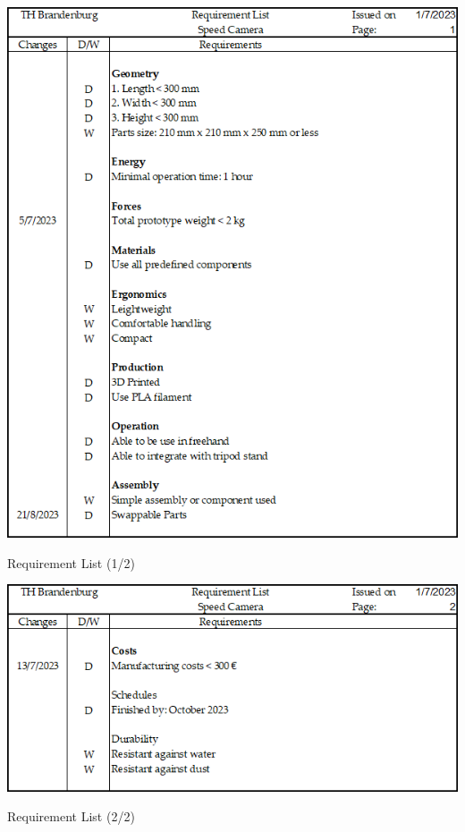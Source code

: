 \begin{table}[H]
    \centering
    \includegraphics[width= 0.9\linewidth]{texs/Part1/chapter2/image/req1.png}
    \caption{Requirement List (1/2)}
    \label{tab:req1}
\end{table}

\begin{table}[H]
    \centering
    \includegraphics[width= 0.9\linewidth]{texs/Part1/chapter2/image/req2.png}
    \caption{Requirement List (2/2)}
    \label{tab:req2}
\end{table}
